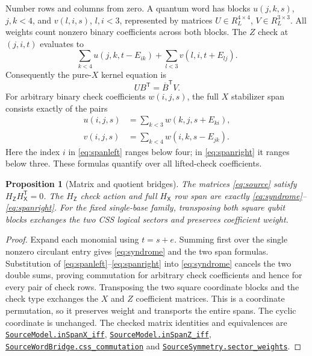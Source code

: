 \documentclass[11pt]{article}
\makeatletter
\newtheorem{proposition}[theorem]{Proposition}
\theoremstyle{definition}\newtheorem{definition}[theorem]{Definition}
\newcommand{\HX}{H_{\mathsf X}}
\newcommand{\HZ}{H_{\mathsf Z}}
\newcommand{\proofcommit}{98eb91cd9049e6a88887a5ba79150ad96a4a3e53}
\newcommand{\proofbase}{https://github.com/alectionary/vibe-math/blob/\proofcommit/formalization/distance-preservation}
\newcommand{\lean}[2]{\href{\proofbase/#1.lean\#L\csname leanline@#2\endcsname}{\nolinkurl{#2}}}
\makeatother
\begin{document}
Number rows and columns from zero. A quantum word has blocks
$u(j,k,s)$, $j,k<4$, and $v(l,i,s)$, $l,i<3$, represented by matrices
$U\in R_L^{4\times4}$, $V\in R_L^{3\times3}$. All weights count
nonzero binary coefficients across both blocks. The $Z$ check at
$(j,i,t)$ evaluates to
\begin{equation}\label{eq:syndrome}
 \sum_{k<4}u(j,k,t-E_{ik})+
 \sum_{l<3}v(l,i,t+E_{lj}).
\end{equation}
Consequently the pure-$X$ kernel equation is
\begin{equation}\label{eq:ringkernel}
 UB^{\mathsf T}=\overline B^{\mathsf T}V.
\end{equation}
For arbitrary binary check coefficients $w(i,j,s)$, the full $X$ stabilizer
span consists exactly of the pairs
\begin{align}
 u(i,j,s)&=\sum_{k<3}w(k,j,s+E_{ki}),\label{eq:spanleft}\\
 v(i,j,s)&=\sum_{k<4}w(i,k,s-E_{jk}).\label{eq:spanright}
\end{align}
Here the index $i$ in \eqref{eq:spanleft} ranges below four; in
\eqref{eq:spanright} it ranges below three. These formulas quantify
over all lifted-check coefficients.

\begin{proposition}[Matrix and quotient bridges]\label{prop:bridges}
The matrices \eqref{eq:source} satisfy $\HZ\HX^{\mathsf T}=0$.
The $\HZ$ check action and full $\HX$ row span are exactly
\eqref{eq:syndrome}--\eqref{eq:spanright}. For the fixed single-base
family, transposing both square qubit blocks exchanges the two CSS
logical sectors and preserves coefficient weight.
\end{proposition}
\begin{proof}
Expand each monomial using $t=s+e$. Summing first over the single
nonzero circulant entry gives \eqref{eq:syndrome} and the two span
formulas. Substitution of \eqref{eq:spanleft}--\eqref{eq:spanright}
into \eqref{eq:syndrome} cancels the two double sums, proving
commutation for arbitrary check coefficients and hence for every pair
of check rows. Transposing the two square coordinate blocks and the
check type exchanges the $X$ and $Z$ coefficient matrices. This is a
coordinate permutation, so it preserves weight and transports the
entire spans. The cyclic coordinate is unchanged.
The checked matrix identities and equivalences are
\lean{SourceSectors}{SourceModel.inSpanX_iff},
\lean{SourceSectors}{SourceModel.inSpanZ_iff},
\lean{SourceWordBridge}{SourceWordBridge.css_commutation} and
\lean{SourceSymmetry}{SourceSymmetry.sector_weights}.
\end{proof}
\end{document}
